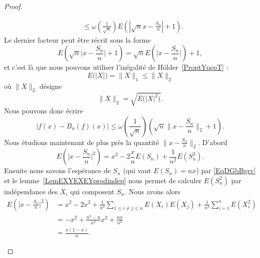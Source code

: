 \begin{proof}
\begin{enumerate}
\begin{subequations}
\begin{align}
				                                 & \leq \omega\left( \frac{1}{ \sqrt{n} } \right)E\left( | \sqrt{n}x-\frac{ S_n }{ n } |+1 \right).
			      \end{align}
		      \end{subequations}
		      Le dernier facteur peut être récrit sous la forme
		      \begin{equation}
			      E\left( \sqrt{n}\big| x-\frac{ S_n }{ n } \big|+1 \right)=\sqrt{n}E\left( \big| x-\frac{ S_n }{ n } \big| \right)+1,
		      \end{equation}
		      et c'est là que nous pouvons utiliser l'inégalité de Hölder~\ref{ProptYqspT} :
		      \begin{equation}
			      E\big( | X | \big)=\| X \|_1\leq\| X \|_2
		      \end{equation}
		      où \( \| X \|_2\) désigne
		      \begin{equation}
			      \| X \|_2=\sqrt{ E\big( | X |^2 \big)  }.
		      \end{equation}
		      Nous pouvons donc écrire
		      \begin{equation}
			      \big| f(x)-B_n(f)(x) \big|\leq \omega\left( \frac{1}{ \sqrt{n} } \right)\left( \sqrt{n}\big\| x-\frac{ S_n }{ n } \big\|_2+1 \right).
		      \end{equation}
		      Nous étudions maintenant de plus près la quantité \( \| x-\frac{ S_n }{ n } \|_2\). D'abord
		      \begin{equation}
			      E\left( \big| x-\frac{ S_n }{ n } \big|^2 \right)=x^2-2\frac{ x }{ n }E(S_n)+\frac{1}{ n^2 }E(S_n^2).
		      \end{equation}
		      Ensuite nous savons l'espérance de \( S_n\) (qui vaut \( E(S_n)=nx\)) par \eqref{EqDGbBgrv} et le lemme~\ref{LemEXYEXEYprodindep} nous permet de calculer \( E(S_n^2)\) par indépendance des \( X_i\) qui composent \( S_n\). Nous avons alors
		      \begin{subequations}
			      \begin{align}
				      E\left( \big| x-\frac{ S_n }{ n } \big|^2 \right) & =x^2-2x^2+\frac{1}{ n^2 }\sum_{1\leq i\neq j\leq n}E(X_i)E(X_j)+\frac{1}{ n^2 }\sum_{i=1}^nE(X_i^2) \\
				                                                        & =-x^2+\frac{ n^2-n }{ n^2 }x^2+\frac{ nx }{ n^2 }                                                   \\
				                                                        & =\frac{ x(1-x) }{ n }.

\end{align}
\end{subequations}
\end{enumerate}
\end{proof}
